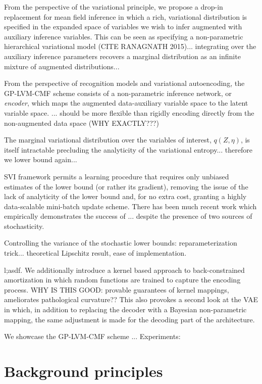 \documentclass[]{article}
\begin{document}
From the perspective of the variational principle, we propose a drop-in replacement for mean field inference in which a rich, variational distribution is specified in the expanded space of variables we wish to infer augmented with auxiliary inference variables.
This can be seen as specifying a non-parametric hierarchical variational model (CITE RANAGNATH 2015)... integrating over the auxiliary inference parameters recovers a marginal distribution as an infinite mixture of augmented distributions...

From the perspective of recognition models and variational autoencoding, the GP-LVM-CMF scheme consists of a non-parametric inference network, or \emph{encoder}, which maps the augmented data-auxiliary variable space to the latent variable space. ... should be more flexible than rigidly encoding directly from the non-augmented data space (WHY EXACTLY???)

The marginal variational distribution over the variables of interest, $q(Z,\eta)$, is itself intractable precluding the analyticity of the variational entropy... therefore we lower bound again...

SVI framework permits a learning procedure that requires only unbiased estimates of the lower bound (or rather its gradient), removing the issue of the lack of analyticity of the lower bound and, for no extra cost, granting a highly data-scalable mini-batch update scheme.
There has been much recent work which empirically demonstrates the success of ... despite the presence of two sources of stochasticity.

Controlling the variance of the stochastic lower bounds: reparameterization trick... theoretical Lipschitz result, ease of implementation.


l;asdf. We additionally introduce a kernel based approach to back-constrained amortization in which random functions are trained to capture the encoding process.
WHY IS THIS GOOD: provable guarantees of kernel mappings, ameliorates pathological curvature??
This also provokes a second look at the VAE in which, in addition to replacing the decoder with a Bayesian non-parametric mapping, the same adjustment is made for the decoding part of the architecture.

We showcase the GP-LVM-CMF scheme ...
Experiments:

\section{Background principles}\label{sec:background}
\end{document}
